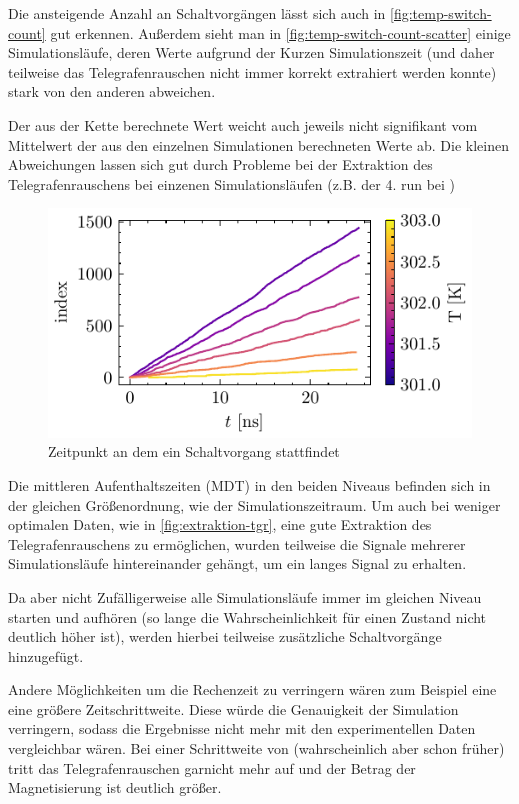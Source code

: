 \documentclass[main.tex]{subfiles}
\begin{document}
Die ansteigende Anzahl an Schaltvorgängen lässt sich auch in \cref{fig:temp-switch-count} gut erkennen. Außerdem sieht man in \cref{fig:temp-switch-count-scatter} einige Simulationsläufe, deren Werte aufgrund der Kurzen Simulationszeit (und daher teilweise das Telegrafenrauschen nicht immer korrekt extrahiert werden konnte) stark von den anderen abweichen.

Der aus der Kette berechnete Wert weicht auch jeweils nicht signifikant vom Mittelwert der aus den einzelnen Simulationen berechneten Werte ab.
Die kleinen Abweichungen lassen sich gut durch Probleme bei der Extraktion des Telegrafenrauschens bei einzenen Simulationsläufen (z.B. der 4. run bei ) 


\begin{figure}[H]
    \centering
    \includegraphics{bilder/plots/temp_comparison/switch_events.pdf}
    \caption{Zeitpunkt an dem ein Schaltvorgang stattfindet }\label{fig:switch-events}
\end{figure}

Die mittleren Aufenthaltszeiten (MDT) in den beiden Niveaus befinden sich in der gleichen Größenordnung, wie der Simulationszeitraum. Um auch bei weniger optimalen Daten, wie in \cref{fig:extraktion-tgr}, eine gute Extraktion des Telegrafenrauschens zu ermöglichen, wurden teilweise die Signale mehrerer Simulationsläufe hintereinander gehängt, um ein langes Signal zu erhalten.

Da aber nicht Zufälligerweise alle Simulationsläufe immer im gleichen Niveau starten und aufhören (so lange die Wahrscheinlichkeit für einen Zustand nicht deutlich höher ist), werden hierbei teilweise zusätzliche Schaltvorgänge hinzugefügt. 

Andere Möglichkeiten um die Rechenzeit zu verringern wären zum Beispiel eine eine größere Zeitschrittweite. Diese würde die Genauigkeit der Simulation verringern, sodass die Ergebnisse nicht mehr mit den experimentellen Daten vergleichbar wären. Bei einer Schrittweite von  (wahrscheinlich aber schon früher) tritt das Telegrafenrauschen garnicht mehr auf und der Betrag der Magnetisierung ist deutlich größer.
\end{document}
